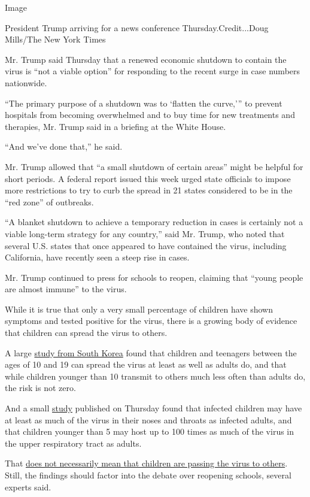 Image

President Trump arriving for a news conference Thursday.Credit...Doug
Mills/The New York Times

Mr. Trump said Thursday that a renewed economic shutdown to contain the
virus is ``not a viable option'' for responding to the recent surge in
case numbers nationwide.

``The primary purpose of a shutdown was to `flatten the curve,''' to
prevent hospitals from becoming overwhelmed and to buy time for new
treatments and therapies, Mr. Trump said in a briefing at the White
House.

``And we've done that,'' he said.

Mr. Trump allowed that ``a small shutdown of certain areas'' might be
helpful for short periods. A federal report issued this week urged state
officials to impose more restrictions to try to curb the spread in 21
states considered to be in the ``red zone'' of outbreaks.

``A blanket shutdown to achieve a temporary reduction in cases is
certainly not a viable long-term strategy for any country,'' said Mr.
Trump, who noted that several U.S. states that once appeared to have
contained the virus, including California, have recently seen a steep
rise in cases.

Mr. Trump continued to press for schools to reopen, claiming that
``young people are almost immune'' to the virus.

While it is true that only a very small percentage of children have
shown symptoms and tested positive for the virus, there is a growing
body of evidence that children can spread the virus to others.

A large
\href{https://www.nytimes.com/2020/07/18/health/coronavirus-children-schools.html}{study
from South Korea} found that children and teenagers between the ages of
10 and 19 can spread the virus at least as well as adults do, and that
while children younger than 10 transmit to others much less often than
adults do, the risk is not zero.

And a small
\href{https://jamanetwork.com/journals/jamapediatrics/fullarticle/2768952}{study}
published on Thursday found that infected children may have at least as
much of the virus in their noses and throats as infected adults, and
that children younger than 5 may host up to 100 times as much of the
virus in the upper respiratory tract as adults.

That
\href{https://www.nytimes.com/2020/07/30/health/coronavirus-children.html}{does
not necessarily mean that children are passing the virus to others}.
Still, the findings should factor into the debate over reopening
schools, several experts said.

